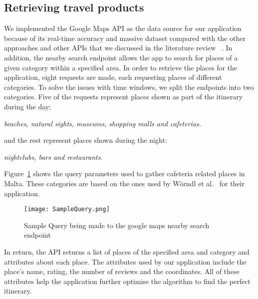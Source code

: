 \subsection{Retrieving travel products}

We implemented the Google Maps API as the data source for our application
because of its real-time accuracy and massive dataset compared with the other
approaches and other APIs that we discussed in the literature review
~\cite{googleSite, iltifat2014generation}. In addition, the nearby search
endpoint allows the app to search
for places of a given category within a specified
area. In order to retrieve the places for the
application, eight requests are made, each requesting
places of different categories.
To solve the issues with
time windows, we split the
endpoints into two categories. Five of the requests represent places shown as
part of the itinerary during the day:

\begin{center}
    
\textit{beaches, natural sights, museums, shopping malls and cafeterias.}
\end{center}

and the rest represent places shown
during the night: 

\begin{center}
\textit{nightclubs, bars and restaurants}. 
    
\end{center}


Figure~\ref{SampleQuery} shows the query parameters 
used to gather cafeteria related places in Malta. These
categories are based on the ones used by Wörndl et al.~\cite{Worndl2017} for their
application.

\begin{figure}[h]
\centering
\texttt{[image: SampleQuery.png]}
\caption{Sample Query being made to the google maps nearby search endpoint}
\label{SampleQuery}
\end{figure}


In return, the API returns a list of places of the specified area and category
and attributes about each place. The attributes used by our application include
the place's name, rating, the number of reviews and the coordinates. All of
these attributes help the application further optimise the algorithm to find
the perfect itinerary. 






